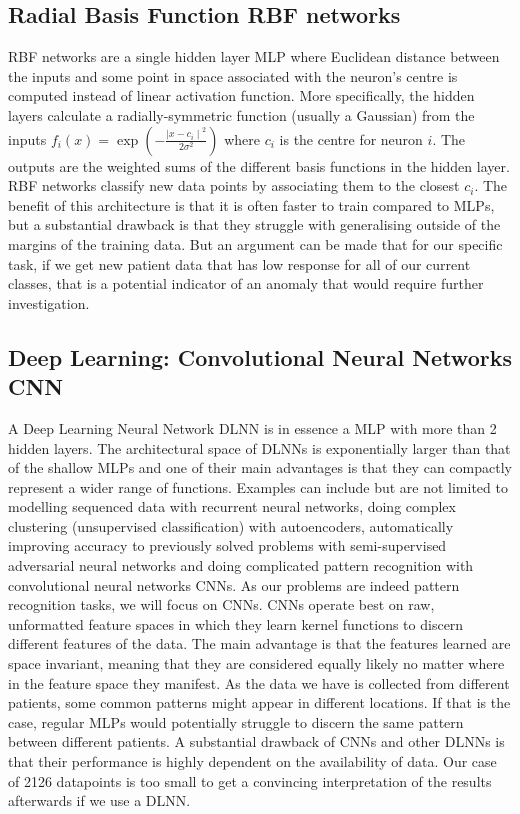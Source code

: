 \documentclass[11pt,a4paper]{article}
\begin{document}
\subsection{Radial Basis Function RBF networks}
RBF networks are a single hidden layer MLP where Euclidean distance between the inputs and some point in space associated with the neuron's centre is computed instead of linear activation function. More specifically, the hidden layers calculate a radially-symmetric function (usually a Gaussian) from the inputs \(f_i(x) = \exp \left(-\frac{{\mid x - c_i \mid}^2}{2 \sigma^2} \right) \) where \(c_i\) is the centre for neuron \(i\). The outputs are the weighted sums of the different basis functions in the hidden layer.
RBF networks classify new data points by associating them to the closest \(c_i\). The benefit of this architecture is that it is often faster to train compared to MLPs, but a substantial drawback is that they struggle with generalising outside of the margins of the training data. But an argument can be made that for our specific task, if we get new patient data that has low response for all of our current classes, that is a potential indicator of an anomaly that would require further investigation.

\subsection{Deep Learning: Convolutional Neural Networks CNN}
\label{sec:CNN}
A Deep Learning Neural Network DLNN is in essence a MLP with more than 2 hidden layers. The architectural space of DLNNs is exponentially larger than that of the shallow MLPs and one of their main advantages is that they can compactly represent a wider range of functions. Examples can include but are not limited to modelling sequenced data with recurrent neural networks, doing complex clustering (unsupervised classification) with autoencoders, automatically improving accuracy to previously solved problems with semi-supervised adversarial neural networks and doing complicated pattern recognition with convolutional neural networks CNNs. As our problems are indeed pattern recognition tasks, we will focus on CNNs. CNNs operate best on raw, unformatted feature spaces in which they learn kernel functions to discern different features of the data. The main advantage is that the features learned are space invariant, meaning that they are considered equally likely no matter where in the feature space they manifest. As the data we have is collected from different patients, some common patterns might appear in different locations. If that is the case, regular MLPs would potentially struggle to discern the same pattern between different patients. A substantial drawback of CNNs and other DLNNs is that their performance is highly dependent on the availability of data. Our case of 2126 datapoints is too small to get a convincing interpretation of the results afterwards if we use a DLNN.
\end{document}
